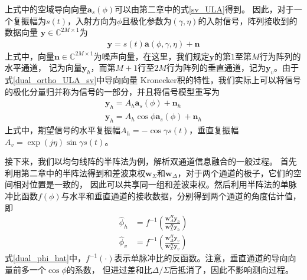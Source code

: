 \documentclass[master]{thesis-uestc}
\begin{document}
上式中的空域导向向量$\bm{a}_s(\phi)$可以由第二章中的式\eqref{sv_ULA}得到。
因此，对于一个复振幅为$s(t)$，入射方向为$\phi$且极化参数为$(\gamma,\eta)$的入射信号，阵列接收到的数据向量
$\bm{y}\in\mathbb{C}^{2M\times1}$为
\begin{equation}
    \begin{aligned}
        \bm{y} = s(t)\bm{a}(\phi,\gamma,\eta) + \bm{n}
    \end{aligned}
\end{equation}
上式中，向量$\bm{n}\in\mathbb{C}^{2M\times1}$为噪声向量，在这里，我们规定$\bm{y}$的第$1$至第$M$行为阵列的水平通道，
记为向量$\bm{y}_h$，而第$M+1$行至$2M$行为阵列的垂直通道，记为$\bm{y}_v$。由于式\eqref{dual_ortho_ULA_sv}中导向向量
Kronecker积的特性，我们实际上可以将信号的极化分量归并称为信号的一部分，并且将信号模型重写为
\begin{subequations}
    \begin{align}
        \bm{y}_h = A_h\bm{a}_s(\phi) + \bm{n}_h \\
        \bm{y}_h = A_h\cos\phi\bm{a}_s(\phi) + \bm{n}_h
    \end{align}
\end{subequations}
上式中，期望信号的水平复振幅$A_h=-\cos\gamma s(t)$，垂直复振幅$A_v=\exp(j\eta)\sin\gamma s(t)$。

接下来，我们以均匀线阵的半阵法为例，解析双通道信息融合的一般过程。
首先利用第二章中的半阵法得到和差波束权$\bm{w}_\Sigma$和$\bm{w}_\Delta$，对于两个通道的极子，它们的空间相对位置是一致的，
因此可以共享同一组和差波束权。然后利用半阵法的单脉冲比函数$f(\phi)$与水平和垂直通道的接收数据，分别得到两个通道的角度估计值，
即
\begin{subequations}\label{dual_phi_hat}
    \begin{align}
        \hat{\phi}_h &= f^{-1}\left(\frac{\bm{w}_\Delta^H\bm{y}_h}{\bm{w}_\Sigma^H\bm{y}_h}\right) \\
        \hat{\phi}_v &= f^{-1}\left(\frac{\bm{w}_\Delta^H\bm{y}_v}{\bm{w}_\Sigma^H\bm{y}_v}\right)
    \end{align}
\end{subequations}
式\eqref{dual_phi_hat}中，$f^{-1}(\cdot)$表示单脉冲比的反函数。注意，垂直通道的导向向量前多一个$\cos\phi$的系数，
但进过差和比$\Delta/\Sigma$后抵消了，因此不影响测向过程。
\end{document}
